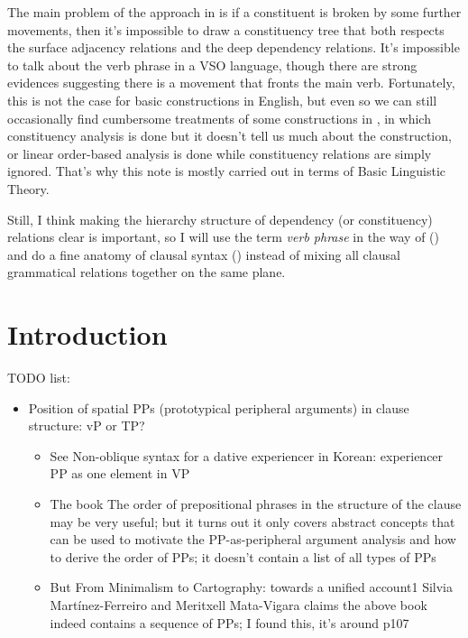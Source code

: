\documentclass[UTF8, a4paper, oneside, scheme=plain]{ctexrep}
\newcommand*{\term}[1]{\emph{#1}}
\begin{document}
The main problem of the approach in \citet{cgel} is 
if a constituent is broken by some further movements,
then it's impossible to draw a constituency tree that 
both respects the surface adjacency relations 
and the deep dependency relations.
It's impossible to talk about the verb phrase in a VSO language,
though there are strong evidences suggesting there is a movement that fronts the main verb.
Fortunately, this is not the case for basic constructions in English,
but even so we can still occasionally find cumbersome treatments of some constructions in \citet{cgel},
in which constituency analysis is done but it doesn't tell us much about the construction,
or linear order-based analysis is done while constituency relations are simply ignored.
That's why this note is mostly carried out in terms of Basic Linguistic Theory.

Still, I think making the hierarchy structure of dependency (or constituency) relations clear 
is important,
so I will use the term \term{verb phrase} in the way of \citet{cgel} ()
and do a fine anatomy of clausal syntax ()
instead of mixing all clausal grammatical relations together on the same plane.

\chapter{Introduction}

\setcounter{page}{1}

TODO list:
\begin{itemize}
    \item Position of spatial PPs (prototypical peripheral arguments) in clause structure: vP or TP?
    \begin{itemize}
        \item See Non-oblique syntax for a dative experiencer in Korean: experiencer PP as one element in VP
        \item The book The order of prepositional phrases in the structure of the clause may be very useful;
        but it turns out it only covers abstract concepts that can be used to motivate the PP-as-peripheral argument analysis and how to derive the order of PPs; it doesn't contain a list of all types of PPs
        \item But From Minimalism to Cartography: towards a unified account1
        Silvia Martínez-Ferreiro and Meritxell Mata-Vigara claims the above book indeed contains 
        a sequence of PPs; I found this, it's around p107
    \end{itemize}
\end{itemize}
\end{document}
